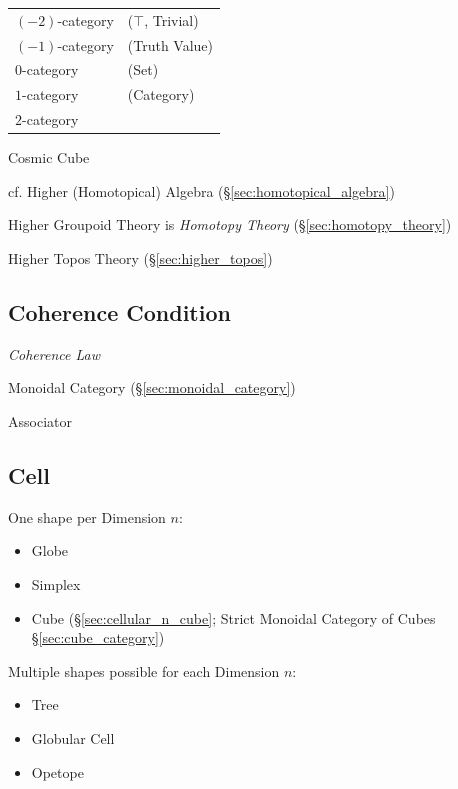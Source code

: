 \begin{tabular}{l l}
  $(-2)$-category   & ($\top$, Trivial) \\
  $(-1)$-category   & (Truth Value) \\
  $0$-category      & (Set) \\
  $1$-category      & (Category) \\
  $2$-category      & \\
\end{tabular}

Cosmic Cube %

cf. Higher (Homotopical) Algebra (\S\ref{sec:homotopical_algebra})

\fist Higher Groupoid Theory is \emph{Homotopy Theory}
(\S\ref{sec:homotopy_theory})

\fist Higher Topos Theory (\S\ref{sec:higher_topos})



\subsection{Coherence Condition}\label{sec:coherence_condition}

\emph{Coherence Law}

Monoidal Category (\S\ref{sec:monoidal_category})

Associator



\subsection{Cell}\label{sec:cell}

One shape per Dimension $n$:
\begin{itemize}
  \item Globe
  \item Simplex
  \item Cube (\S\ref{sec:cellular_n_cube}; \fist Strict Monoidal Category of
    Cubes \S\ref{sec:cube_category})
\end{itemize}

Multiple shapes possible for each Dimension $n$:
\begin{itemize}
  \item Tree
  \item Globular Cell
  \item Opetope
\end{itemize}

